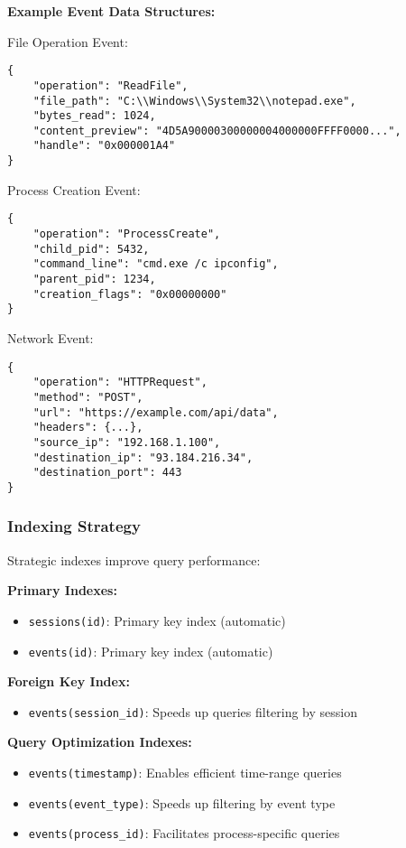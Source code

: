 \textbf{Example Event Data Structures:}

File Operation Event:
\begin{verbatim}
{
    "operation": "ReadFile",
    "file_path": "C:\\Windows\\System32\\notepad.exe",
    "bytes_read": 1024,
    "content_preview": "4D5A90000300000004000000FFFF0000...",
    "handle": "0x000001A4"
}
\end{verbatim}

Process Creation Event:
\begin{verbatim}
{
    "operation": "ProcessCreate",
    "child_pid": 5432,
    "command_line": "cmd.exe /c ipconfig",
    "parent_pid": 1234,
    "creation_flags": "0x00000000"
}
\end{verbatim}

Network Event:
\begin{verbatim}
{
    "operation": "HTTPRequest",
    "method": "POST",
    "url": "https://example.com/api/data",
    "headers": {...},
    "source_ip": "192.168.1.100",
    "destination_ip": "93.184.216.34",
    "destination_port": 443
}
\end{verbatim}

\subsubsection{Indexing Strategy}

Strategic indexes improve query performance:

\textbf{Primary Indexes:}
\begin{itemize}
    \item \texttt{sessions(id)}: Primary key index (automatic)
    \item \texttt{events(id)}: Primary key index (automatic)
\end{itemize}

\textbf{Foreign Key Index:}
\begin{itemize}
    \item \texttt{events(session\_id)}: Speeds up queries filtering by session
\end{itemize}

\textbf{Query Optimization Indexes:}
\begin{itemize}
    \item \texttt{events(timestamp)}: Enables efficient time-range queries
    \item \texttt{events(event\_type)}: Speeds up filtering by event type
    \item \texttt{events(process\_id)}: Facilitates process-specific queries
\end{itemize}

